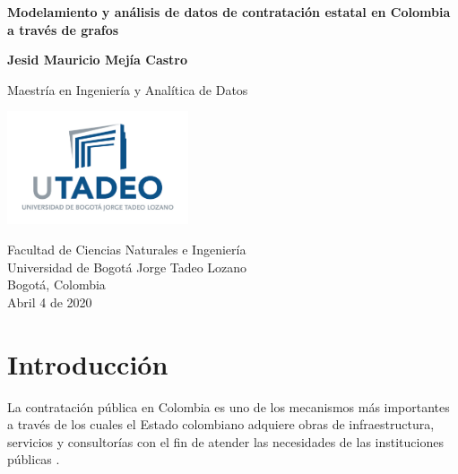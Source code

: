 \documentclass[11pt,letterpaper,oneside]{article}
\author{Jesid Mauricio Mejía Castro}
\begin{document}


\begin{titlepage}
   \begin{center}
       \vspace*{1cm}

       \textbf{Modelamiento y análisis de datos de contratación estatal en Colombia a través de grafos}

       \vspace{0.5cm}
            
       \vspace{1.5cm} 

       \textbf{Jesid Mauricio Mejía Castro}

       \vspace{9.5cm}
            
       Maestría en Ingeniería y Analítica de Datos
            
       \vspace{0.4cm}
     
       \includegraphics[width=0.4\textwidth]{logo-utadeo-vert.jpg}
            
       Facultad de Ciencias Naturales e Ingeniería\\
       Universidad de Bogotá Jorge Tadeo Lozano\\
       Bogotá, Colombia\\
       Abril 4 de 2020
            
   \end{center}
\end{titlepage}

\tableofcontents
\newpage

\section{Introducción}
La contratación pública en Colombia es uno de los mecanismos más importantes a través de los cuales el Estado colombiano adquiere obras de infraestructura, servicios y consultorías con el fin de atender las necesidades de las instituciones públicas \cite{Angarita-2018}.
\end{document}
